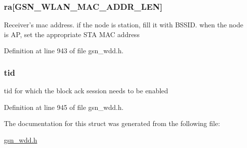 \hypertarget{a00270_a1d97eb2e070b4a95218b41f6abbff9d7}{
\subsubsection[{ra}]{ {\bf ra}\mbox{[}GSN\_\-WLAN\_\-MAC\_\-ADDR\_\-LEN\mbox{]}}}
\label{a00270_a1d97eb2e070b4a95218b41f6abbff9d7}
Receiver's mac address. if the node is station, fill it with BSSID. when the node is AP, set the appropriate STA MAC address 

Definition at line 943 of file gsn\_\-wdd.h.

\hypertarget{a00270_abf69ed815c8482f9995e41bc0aff9043}{
\subsubsection[{tid}]{ {\bf tid}}}
\label{a00270_abf69ed815c8482f9995e41bc0aff9043}
tid for which the block ack session needs to be enabled 

Definition at line 945 of file gsn\_\-wdd.h.



The documentation for this struct was generated from the following file:\begin{DoxyCompactItemize}
\item 
\hyperlink{a00603}{gsn\_\-wdd.h}\end{DoxyCompactItemize}
